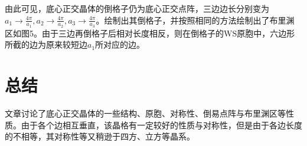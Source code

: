 \documentclass{article}
\begin{document}
由此可见，底心正交晶体的倒格子仍为底心正交点阵，三边边长分别变为$ a_1\rightarrow\frac{4\pi}{a_1} ,a_2\rightarrow\frac{4\pi}{a_2},a_3\rightarrow\frac{4\pi}{a_3}$。绘制出其倒格子，并按照相同的方法绘制出了布里渊区如图5。由于三边再倒格子后相对长度相反，则在倒格子的WS原胞中，六边形所截的边为原来较短边$ a_1 $所对应的边。

\section{总结}
文章讨论了底心正交晶体的一些结构、原胞、对称性、倒易点阵与布里渊区等性质。由于各个边相互垂直，该晶格有一定较好的性质与对称性，但是由于各边长度的不相等，其对称性等又稍逊于四方、立方等晶系。
\end{document}
